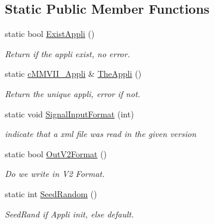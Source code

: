 \subsection*{Static Public Member Functions}
\begin{DoxyCompactItemize}
\item 
static bool \hyperlink{classMMVII_1_1cMMVII__Appli_a1d8e2fd998afba923fc8bf11ee8dde9c}{Exist\+Appli} ()\hypertarget{classMMVII_1_1cMMVII__Appli_a1d8e2fd998afba923fc8bf11ee8dde9c}{}\label{classMMVII_1_1cMMVII__Appli_a1d8e2fd998afba923fc8bf11ee8dde9c}

\begin{DoxyCompactList}\small\item\em Return if the appli exist, no error. \end{DoxyCompactList}\item 
static \hyperlink{classMMVII_1_1cMMVII__Appli}{c\+M\+M\+V\+I\+I\+\_\+\+Appli} \& \hyperlink{classMMVII_1_1cMMVII__Appli_a3d4847c20c5a40eb4766b4e094f93fb6}{The\+Appli} ()\hypertarget{classMMVII_1_1cMMVII__Appli_a3d4847c20c5a40eb4766b4e094f93fb6}{}\label{classMMVII_1_1cMMVII__Appli_a3d4847c20c5a40eb4766b4e094f93fb6}

\begin{DoxyCompactList}\small\item\em Return the unique appli, error if not. \end{DoxyCompactList}\item 
static void \hyperlink{classMMVII_1_1cMMVII__Appli_a62df3f17da837296186e611f772af451}{Signal\+Input\+Format} (int)\hypertarget{classMMVII_1_1cMMVII__Appli_a62df3f17da837296186e611f772af451}{}\label{classMMVII_1_1cMMVII__Appli_a62df3f17da837296186e611f772af451}

\begin{DoxyCompactList}\small\item\em indicate that a xml file was read in the given version \end{DoxyCompactList}\item 
static bool \hyperlink{classMMVII_1_1cMMVII__Appli_a8cbf6cc6f6aa96ece448a47101125533}{Out\+V2\+Format} ()\hypertarget{classMMVII_1_1cMMVII__Appli_a8cbf6cc6f6aa96ece448a47101125533}{}\label{classMMVII_1_1cMMVII__Appli_a8cbf6cc6f6aa96ece448a47101125533}

\begin{DoxyCompactList}\small\item\em Do we write in V2 Format. \end{DoxyCompactList}\item 
static int \hyperlink{classMMVII_1_1cMMVII__Appli_adb6999578589823053251236d81707f0}{Seed\+Random} ()\hypertarget{classMMVII_1_1cMMVII__Appli_adb6999578589823053251236d81707f0}{}\label{classMMVII_1_1cMMVII__Appli_adb6999578589823053251236d81707f0}

\begin{DoxyCompactList}\small\item\em Seed\+Rand if Appli init, else default. \end{DoxyCompactList}\end{DoxyCompactItemize}
